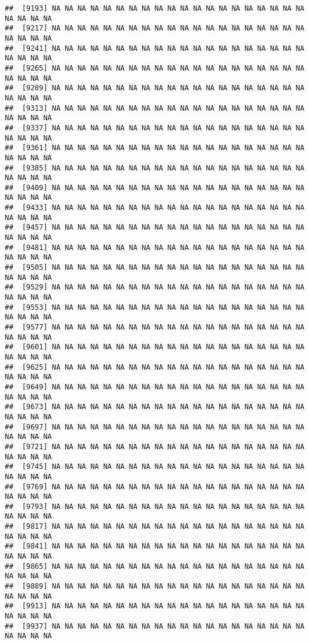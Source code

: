 \documentclass[
]{article}
\begin{document}
\begin{verbatim}
##  [9193] NA NA NA NA NA NA NA NA NA NA NA NA NA NA NA NA NA NA NA NA NA NA NA NA
##  [9217] NA NA NA NA NA NA NA NA NA NA NA NA NA NA NA NA NA NA NA NA NA NA NA NA
##  [9241] NA NA NA NA NA NA NA NA NA NA NA NA NA NA NA NA NA NA NA NA NA NA NA NA
##  [9265] NA NA NA NA NA NA NA NA NA NA NA NA NA NA NA NA NA NA NA NA NA NA NA NA
##  [9289] NA NA NA NA NA NA NA NA NA NA NA NA NA NA NA NA NA NA NA NA NA NA NA NA
##  [9313] NA NA NA NA NA NA NA NA NA NA NA NA NA NA NA NA NA NA NA NA NA NA NA NA
##  [9337] NA NA NA NA NA NA NA NA NA NA NA NA NA NA NA NA NA NA NA NA NA NA NA NA
##  [9361] NA NA NA NA NA NA NA NA NA NA NA NA NA NA NA NA NA NA NA NA NA NA NA NA
##  [9385] NA NA NA NA NA NA NA NA NA NA NA NA NA NA NA NA NA NA NA NA NA NA NA NA
##  [9409] NA NA NA NA NA NA NA NA NA NA NA NA NA NA NA NA NA NA NA NA NA NA NA NA
##  [9433] NA NA NA NA NA NA NA NA NA NA NA NA NA NA NA NA NA NA NA NA NA NA NA NA
##  [9457] NA NA NA NA NA NA NA NA NA NA NA NA NA NA NA NA NA NA NA NA NA NA NA NA
##  [9481] NA NA NA NA NA NA NA NA NA NA NA NA NA NA NA NA NA NA NA NA NA NA NA NA
##  [9505] NA NA NA NA NA NA NA NA NA NA NA NA NA NA NA NA NA NA NA NA NA NA NA NA
##  [9529] NA NA NA NA NA NA NA NA NA NA NA NA NA NA NA NA NA NA NA NA NA NA NA NA
##  [9553] NA NA NA NA NA NA NA NA NA NA NA NA NA NA NA NA NA NA NA NA NA NA NA NA
##  [9577] NA NA NA NA NA NA NA NA NA NA NA NA NA NA NA NA NA NA NA NA NA NA NA NA
##  [9601] NA NA NA NA NA NA NA NA NA NA NA NA NA NA NA NA NA NA NA NA NA NA NA NA
##  [9625] NA NA NA NA NA NA NA NA NA NA NA NA NA NA NA NA NA NA NA NA NA NA NA NA
##  [9649] NA NA NA NA NA NA NA NA NA NA NA NA NA NA NA NA NA NA NA NA NA NA NA NA
##  [9673] NA NA NA NA NA NA NA NA NA NA NA NA NA NA NA NA NA NA NA NA NA NA NA NA
##  [9697] NA NA NA NA NA NA NA NA NA NA NA NA NA NA NA NA NA NA NA NA NA NA NA NA
##  [9721] NA NA NA NA NA NA NA NA NA NA NA NA NA NA NA NA NA NA NA NA NA NA NA NA
##  [9745] NA NA NA NA NA NA NA NA NA NA NA NA NA NA NA NA NA NA NA NA NA NA NA NA
##  [9769] NA NA NA NA NA NA NA NA NA NA NA NA NA NA NA NA NA NA NA NA NA NA NA NA
##  [9793] NA NA NA NA NA NA NA NA NA NA NA NA NA NA NA NA NA NA NA NA NA NA NA NA
##  [9817] NA NA NA NA NA NA NA NA NA NA NA NA NA NA NA NA NA NA NA NA NA NA NA NA
##  [9841] NA NA NA NA NA NA NA NA NA NA NA NA NA NA NA NA NA NA NA NA NA NA NA NA
##  [9865] NA NA NA NA NA NA NA NA NA NA NA NA NA NA NA NA NA NA NA NA NA NA NA NA
##  [9889] NA NA NA NA NA NA NA NA NA NA NA NA NA NA NA NA NA NA NA NA NA NA NA NA
##  [9913] NA NA NA NA NA NA NA NA NA NA NA NA NA NA NA NA NA NA NA NA NA NA NA NA
##  [9937] NA NA NA NA NA NA NA NA NA NA NA NA NA NA NA NA NA NA NA NA NA NA NA NA

\end{verbatim}
\end{document}
